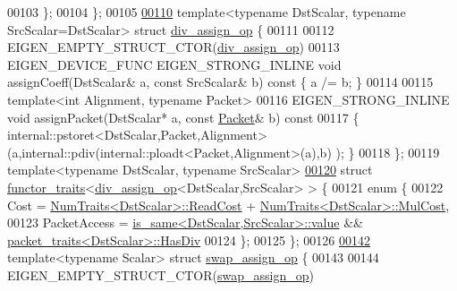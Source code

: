 \begin{DoxyCode}
00103   \};
00104 \};
00105 
\hyperlink{struct_eigen_1_1internal_1_1div__assign__op}{00110} \textcolor{keyword}{template}<\textcolor{keyword}{typename} DstScalar, \textcolor{keyword}{typename} SrcScalar=DstScalar> \textcolor{keyword}{struct }\hyperlink{struct_eigen_1_1internal_1_1div__assign__op}{div\_assign\_op} \{
00111 
00112   EIGEN\_EMPTY\_STRUCT\_CTOR(\hyperlink{struct_eigen_1_1internal_1_1div__assign__op}{div\_assign\_op})
00113   EIGEN\_DEVICE\_FUNC EIGEN\_STRONG\_INLINE \textcolor{keywordtype}{void} assignCoeff(DstScalar& a, \textcolor{keyword}{const} SrcScalar& b)\textcolor{keyword}{ const }\{ a /= b; 
      \}
00114   
00115   \textcolor{keyword}{template}<\textcolor{keywordtype}{int} Alignment, \textcolor{keyword}{typename} Packet>
00116   EIGEN\_STRONG\_INLINE \textcolor{keywordtype}{void} assignPacket(DstScalar* a, \textcolor{keyword}{const} \hyperlink{union_eigen_1_1internal_1_1_packet}{Packet}& b)\textcolor{keyword}{ const}
00117 \textcolor{keyword}{  }\{ internal::pstoret<DstScalar,Packet,Alignment>(a,internal::pdiv(internal::ploadt<Packet,Alignment>(a),b)
      ); \}
00118 \};
00119 \textcolor{keyword}{template}<\textcolor{keyword}{typename} DstScalar, \textcolor{keyword}{typename} SrcScalar>
\hyperlink{struct_eigen_1_1internal_1_1functor__traits_3_01div__assign__op_3_01_dst_scalar_00_01_src_scalar_01_4_01_4}{00120} \textcolor{keyword}{struct }\hyperlink{struct_eigen_1_1internal_1_1functor__traits}{functor\_traits}<\hyperlink{struct_eigen_1_1internal_1_1div__assign__op}{div\_assign\_op}<DstScalar,SrcScalar> > \{
00121   \textcolor{keyword}{enum} \{
00122     Cost = \hyperlink{group___core___module_struct_eigen_1_1_num_traits}{NumTraits<DstScalar>::ReadCost} + 
      \hyperlink{group___core___module_struct_eigen_1_1_num_traits}{NumTraits<DstScalar>::MulCost},
00123     PacketAccess = \hyperlink{struct_eigen_1_1internal_1_1is__same}{is\_same<DstScalar,SrcScalar>::value} && 
      \hyperlink{struct_eigen_1_1internal_1_1packet__traits}{packet\_traits<DstScalar>::HasDiv}
00124   \};
00125 \};
00126 
\hyperlink{struct_eigen_1_1internal_1_1swap__assign__op}{00142} \textcolor{keyword}{template}<\textcolor{keyword}{typename} Scalar> \textcolor{keyword}{struct }\hyperlink{struct_eigen_1_1internal_1_1swap__assign__op}{swap\_assign\_op} \{
00143 
00144   EIGEN\_EMPTY\_STRUCT\_CTOR(\hyperlink{struct_eigen_1_1internal_1_1swap__assign__op}{swap\_assign\_op})

\end{DoxyCode}
